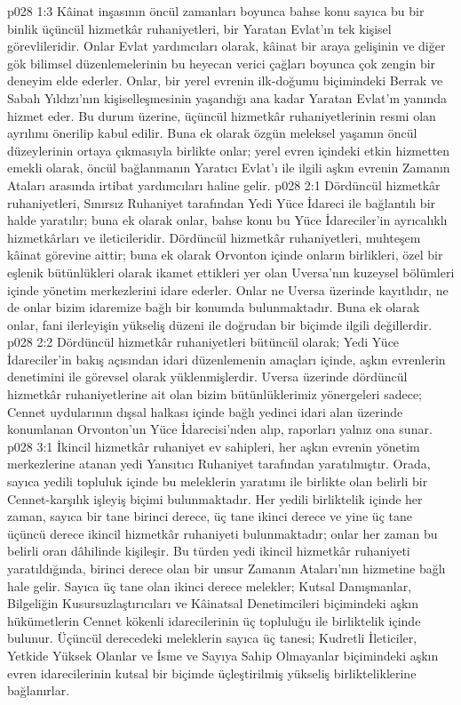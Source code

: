 \vs p028 1:3 Kâinat inşasının öncül zamanları boyunca bahse konu sayıca bu bir binlik üçüncül hizmetkâr ruhaniyetleri, bir Yaratan Evlat’ın tek kişisel görevlileridir. Onlar Evlat yardımcıları olarak, kâinat bir araya gelişinin ve diğer gök bilimsel düzenlemelerinin bu heyecan verici çağları boyunca çok zengin bir deneyim elde ederler. Onlar, bir yerel evrenin ilk\hyp{}doğumu biçimindeki Berrak ve Sabah Yıldızı’nın kişiselleşmesinin yaşandığı ana kadar Yaratan Evlat’ın yanında hizmet eder. Bu durum üzerine, üçüncül hizmetkâr ruhaniyetlerinin resmi olan ayrılımı önerilip kabul edilir. Buna ek olarak özgün meleksel yaşamın öncül düzeylerinin ortaya çıkmasıyla birlikte onlar; yerel evren içindeki etkin hizmetten emekli olarak, öncül bağlanmanın Yaratıcı Evlat’ı ile ilgili aşkın evrenin Zamanın Ataları arasında irtibat yardımcıları haline gelir.
\vs p028 2:1 Dördüncül hizmetkâr ruhaniyetleri, Sınırsız Ruhaniyet tarafından Yedi Yüce İdareci ile bağlantılı bir halde yaratılır; buna ek olarak onlar, bahse konu bu Yüce İdareciler’in ayrıcalıklı hizmetkârları ve ileticileridir. Dördüncül hizmetkâr ruhaniyetleri, muhteşem kâinat görevine aittir; buna ek olarak Orvonton içinde onların birlikleri, özel bir eşlenik bütünlükleri olarak ikamet ettikleri yer olan Uversa’nın kuzeysel bölümleri içinde yönetim merkezlerini idare ederler. Onlar ne Uversa üzerinde kayıtlıdır, ne de onlar bizim idaremize bağlı bir konumda bulunmaktadır. Buna ek olarak onlar, fani ilerleyişin yükseliş düzeni ile doğrudan bir biçimde ilgili değillerdir.
\vs p028 2:2 Dördüncül hizmetkâr ruhaniyetleri bütüncül olarak; Yedi Yüce İdareciler’in bakış açısından idari düzenlemenin amaçları içinde, aşkın evrenlerin denetimini ile görevsel olarak yüklenmişlerdir. Uversa üzerinde dördüncül hizmetkâr ruhaniyetlerine ait olan bizim bütünlüklerimiz yönergeleri sadece; Cennet uydularının dışsal halkası içinde bağlı yedinci idari alan üzerinde konumlanan Orvonton’un Yüce İdarecisi’nden alıp, raporları yalnız ona sunar.
\vs p028 3:1 İkincil hizmetkâr ruhaniyet ev sahipleri, her aşkın evrenin yönetim merkezlerine atanan yedi Yansıtıcı Ruhaniyet tarafından yaratılmıştır. Orada, sayıca yedili topluluk içinde bu meleklerin yaratımı ile birlikte olan belirli bir Cennet\hyp{}karşılık işleyiş biçimi bulunmaktadır. Her yedili birliktelik içinde her zaman, sayıca bir tane birinci derece, üç tane ikinci derece ve yine üç tane üçüncü derece ikincil hizmetkâr ruhaniyeti bulunmaktadır; onlar her zaman bu belirli oran dâhilinde kişileşir. Bu türden yedi ikincil hizmetkâr ruhaniyeti yaratıldığında, birinci derece olan bir unsur Zamanın Ataları’nın hizmetine bağlı hale gelir. Sayıca üç tane olan ikinci derece melekler; Kutsal Danışmanlar, Bilgeliğin Kusursuzlaştırıcıları ve Kâinatsal Denetimcileri biçimindeki aşkın hükümetlerin Cennet kökenli idarecilerinin üç topluluğu ile birliktelik içinde bulunur. Üçüncül derecedeki meleklerin sayıca üç tanesi; Kudretli İleticiler, Yetkide Yüksek Olanlar ve İsme ve Sayıya Sahip Olmayanlar biçimindeki aşkın evren idarecilerinin kutsal bir biçimde üçleştirilmiş yükseliş birlikteliklerine bağlanırlar.
